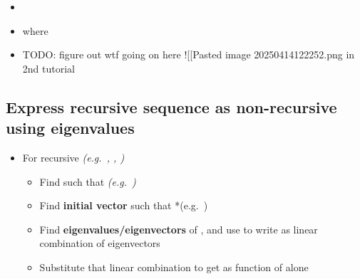 \begin{itemize}

\item
\item
  where
\item
  TODO: figure out wtf going on here !{[}{[}Pasted image
  20250414122252.png\textbar500{]}{]} in 2nd tutorial
\end{itemize}

\subsection*{Express recursive sequence as non-recursive using
eigenvalues}

\begin{itemize}

\item
  For  recursive
  \emph{(e.g.~, ,
  )}

  \begin{itemize}
  
  \item
    Find  such that
    \emph{(e.g.~)}
  \item
    Find \textbf{initial vector}
     such that
    *(e.g.~)
  \item
    Find \textbf{eigenvalues/eigenvectors} of , and use
    to write  as linear combination of eigenvectors
  \item
    Substitute that linear combination to get  as
    function of  alone
  \end{itemize}
\end{itemize}